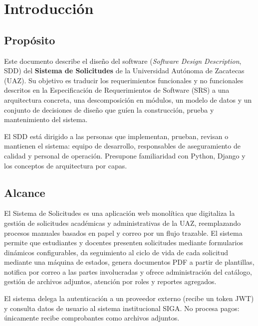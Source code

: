 \documentclass[12pt,letterpaper]{report}
\begin{document}
\tableofcontents\newpage

\chapter{Introducción}

\section{Propósito}

Este documento describe el diseño del software (\textit{Software Design
Description}, SDD) del \textbf{Sistema de Solicitudes} de la Universidad
Autónoma de Zacatecas (UAZ). Su objetivo es traducir los requerimientos
funcionales y no funcionales descritos en la Especificación de Requerimientos
de Software (SRS) a una arquitectura concreta, una descomposición en módulos,
un modelo de datos y un conjunto de decisiones de diseño que guíen la
construcción, prueba y mantenimiento del sistema.

El SDD está dirigido a las personas que implementan, prueban, revisan o
mantienen el sistema: equipo de desarrollo, responsables de aseguramiento de
calidad y personal de operación. Presupone familiaridad con Python, Django y
los conceptos de arquitectura por capas.

\section{Alcance}

El Sistema de Solicitudes es una aplicación web monolítica que digitaliza la
gestión de solicitudes académicas y administrativas de la UAZ, reemplazando
procesos manuales basados en papel y correo por un flujo trazable. El sistema
permite que estudiantes y docentes presenten solicitudes mediante formularios
dinámicos configurables, da seguimiento al ciclo de vida de cada solicitud
mediante una máquina de estados, genera documentos PDF a partir de plantillas,
notifica por correo a las partes involucradas y ofrece administración del
catálogo, gestión de archivos adjuntos, atención por roles y reportes
agregados.

El sistema delega la autenticación a un proveedor externo (recibe un token JWT)
y consulta datos de usuario al sistema institucional SIGA. No procesa pagos:
únicamente recibe comprobantes como archivos adjuntos.
\end{document}
